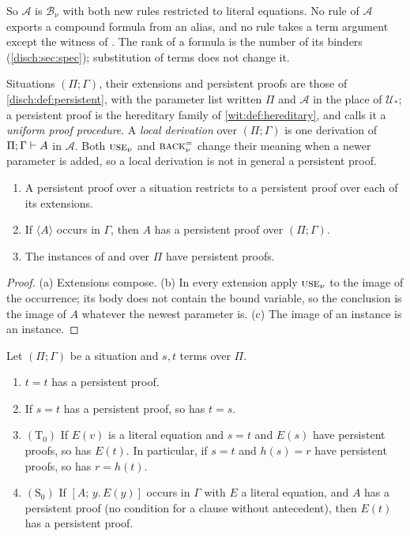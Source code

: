 So $\mathcal A$ is $\mathcal B_{\nu}$ with both new rules restricted to
literal equations. No rule of $\mathcal A$ exports a compound formula from
an alias, and no rule takes a term argument except the witness of
. The rank of a formula is the number of its binders
(\cref{disch:sec:spec}); substitution of terms does not change it.

Situations $(\Pi;\Gamma)$, their extensions and persistent proofs are
those of \cref{disch:def:persistent}, with the parameter list written $\Pi$
and $\mathcal A$ in the place of $\mathcal U_*$; a persistent proof is the
hereditary family of \cref{wit:def:hereditary}, and 
calls it a \emph{uniform proof procedure}. A \emph{local derivation} over
$(\Pi;\Gamma)$ is one derivation of $\Pi;\Gamma\vdash A$ in $\mathcal A$.
Both $\rulename{Use}_{\nu}$ and $\rulename{Back}^{=}_{\nu}$ change their
meaning when a newer parameter is added, so a local derivation is not in
general a persistent proof.

\begin{lemma}
\label{disch:lem:alias-persist}
\begin{enumerate}[label=\textup{(\alph*)}]
\item A persistent proof over a situation restricts to a persistent proof
 over each of its extensions.
\item If $\langle A\rangle$ occurs in $\Gamma$, then $A$ has a persistent
 proof over $(\Pi;\Gamma)$.
\item The instances of  and  over $\Pi$ have
 persistent proofs.
\end{enumerate}
\end{lemma}

\begin{proof}
(a) Extensions compose. (b) In every extension apply
$\rulename{Use}_{\nu}$ to the image of the occurrence; its body does not
contain the bound variable, so the conclusion is the image of $A$ whatever
the newest parameter is. (c) The image of an instance is an instance.
\end{proof}

\begin{lemma}
\label{disch:lem:alias-atomic-base}
Let $(\Pi;\Gamma)$ be a situation and $s,t$ terms over $\Pi$.
\begin{enumerate}[label=\textup{(\roman*)}]
\item $t=t$ has a persistent proof.
\item If $s=t$ has a persistent proof, so has $t=s$.
\item $(\mathrm T_0)$ If $E(v)$ is a literal equation and $s=t$ and $E(s)$
 have persistent proofs, so has $E(t)$. In particular, if $s=t$ and
 $h(s)=r$ have persistent proofs, so has $r=h(t)$.
\item $(\mathrm S_0)$ If $[A;\,y.\,E(y)]$ occurs in $\Gamma$ with $E$ a
 literal equation, and $A$ has a persistent proof (no condition for a
 clause without antecedent), then $E(t)$ has a persistent proof.
\end{enumerate}
\end{lemma}

